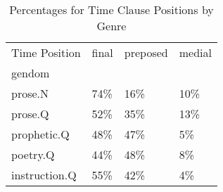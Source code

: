 \begin{table}[htbp!]
\centering
\caption{Percentages for Time Clause Positions by Genre}
\label{table:posig_pr}
\begin{tabular}{llll}
\toprule
Time Position & final & preposed & medial \\
gendom        &       &          &        \\
\midrule
prose.N       &   74\% &      16\% &    10\% \\
prose.Q       &   52\% &      35\% &    13\% \\
prophetic.Q   &   48\% &      47\% &     5\% \\
poetry.Q      &   44\% &      48\% &     8\% \\
instruction.Q &   55\% &      42\% &     4\% \\
\bottomrule
\end{tabular}
\end{table}
